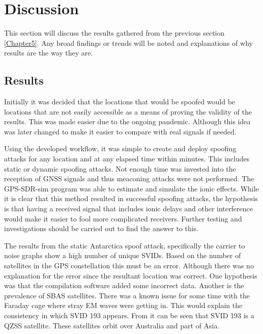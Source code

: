 
\chapter{Discussion} %

\label{Chapter6} %
This section will discuss the results gathered from the previous section \ref{Chapter5}. Any broad findings or trends will be noted and explanations of why results are
the way they are.


\section{Results}
Initially it was decided that the locations that would be spoofed would be locations that are not easily accessible as a means of proving the validity of the results.
This was made easier due to the ongoing pandemic. Although this idea was later changed to make it easier to compare with real signals if needed.

Using the developed workflow, it was simple to create and deploy spoofing attacks for any location and at any elapsed time within minutes. This includes static or dynamic
spoofing attacks. Not enough time was invested into the reception of GNSS signals and thus meaconing attacks were not performed. The GPS-SDR-sim program was able to
estimate and simulate the ionic effects. While it is clear that this method resulted in successful spoofing attacks, the hypothesis is that having a received signal that includes ionic delays
and other interference would make it easier to fool more complicated receivers. Further testing and investigations should be carried out to find the answer to this. 

The results from the static Antarctica spoof attack, specifically the carrier to noise graphs show a high number of unique SVIDs. Based on the number of satellites in the
GPS constellation this must be an error. Although there was no explanation for the error since the resultant location was correct. One hypothesis was that the compilation
software added some incorrect data. Another is the prevalence of SBAS satellites. There was a known issue for some time with the Faraday cage where stray EM waves were
getting in. This would explain the consistency in which SVID 193 appears. From \cite{RN67} it can be seen that SVID 193 is a QZSS satellite. These satellites orbit over
Australia and part of Asia.

